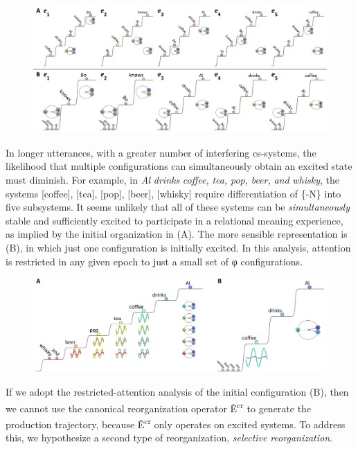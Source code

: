   
\begin{figure}
\includegraphics[width=\textwidth]{figures/Tilsen-img97.png}
\caption{\missingcaption}
\label{fig:}
\end{figure}
 

  In longer utterances, with a greater number of interfering cs-systems, the likelihood that multiple configurations can simultaneously obtain an excited state must diminish. For example, in \textit{Al} \textit{drinks} \textit{coffee,} \textit{tea,} \textit{pop,} \textit{beer,} \textit{and} \textit{whisky}, the systems [coffee], [tea], [pop], [beer], [whisky] require differentiation of \{-N\} into five subsystems. It seems unlikely that all of these systems can be \textit{simultaneously} stable and sufficiently excited to participate in a relational meaning experience, as implied by the initial organization in (A). The more sensible representation is (B), in which just one configuration is initially excited. In this analysis, attention is restricted in any given epoch to just a small set of φ configurations.

  
\begin{figure}
\includegraphics[width=\textwidth]{figures/Tilsen-img98.png}
\caption{\missingcaption}
\label{fig:}
\end{figure}
 

  If we adopt the restricted-attention analysis of the initial configuration (B), then we cannot use the canonical reorganization operator Ê\textsuperscript{cr} to generate the production trajectory, because Ê\textsuperscript{cr} only operates on excited systems. To address this, we hypothesize a second type of reorganization, \textit{selective} \textit{reorganization}.

